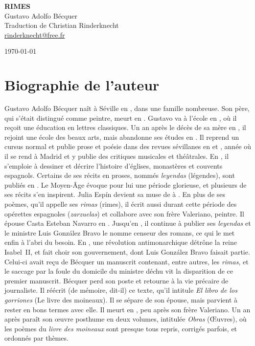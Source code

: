 \documentclass[a4paper,12pt]{book}
\begin{document}
\thispagestyle{empty}
\vspace*{70mm}
\begin{center}
{\Huge\textbf{RIMES}} \\
\vspace*{10mm}
{\Large Gustavo Adolfo Bécquer} \\
\vspace*{10mm}
Traduction de Christian Rinderknecht\\
\url{rinderknecht@free.fr}
\end{center}

\centerline\today

\cleardoublepage

\frenchspacing  %

\chapter{Biographie de l'auteur}

Gustavo Adolfo Bécquer naît à Séville en , dans une
famille nombreuse. Son père, qui s'était distingué comme peintre,
meurt en . Gustavo va à l'école en
, où il reçoit une éducation en lettres
classiques. Un an après le décès de sa mère en , il
rejoint une école des beaux arts, mais abandonne ses études en
. Il reprend un cursus normal et publie prose et
poésie dans des revues sévillanes en  et
, année où il se rend à Madrid et y publie des
critiques musicales et théâtrales. En , il
s'emploie à dessiner et décrire l'histoire d'églises, monastères et
couvents espagnols. Certains de ses récits en proses, nommés
\emph{leyendas} (légendes), sont publiés en . Le
Moyen-Âge évoque pour lui une période glorieuse, et plusieurs de ses
récits s'en inspirent. Julia Espín devient sa muse de
 à . En plus de ses poèmes,
qu'il appelle ses \emph{rimas} (rimes), il écrit aussi durant cette
période des opérettes espagnoles (\emph{zarzuelas}) et collabore avec
son frère Valeriano, peintre. Il épouse Casta Esteban Navarro en
. Jusqu'en , il continue à
publier ses \emph{leyendas} et le ministre Luis González Bravo le
nomme censeur des romans, ce qui le met enfin à l'abri du besoin. En
, une révolution antimonarchique détrône la reine
Isabel~II, et fait choir son gouvernement, dont Luis González Bravo
faisait partie. Celui-ci avait reçu de Bécquer un manuscrit contenant,
entre autres, les \emph{rimas}, et le saccage par la foule du domicile
du ministre déchu vit la disparition de ce premier manuscrit. Bécquer
perd son poste et retourne à la vie précaire de journaliste. Il
réécrit (de mémoire, dit-il) ce texte, qu'il intitule \emph{El libro
de los gorriones} (Le livre des moineaux). Il se sépare de son épouse,
mais parvient à rester en bons termes avec elle. Il meurt en
, peu après son frère Valeriano. Un an après paraît
son œuvre posthume en deux volumes, intitulée \emph{Obras} (Œuvres),
où les poèmes du \emph{livre des moineaux} sont presque tous repris,
corrigés parfois, et ordonnés par thèmes.
\end{document}

